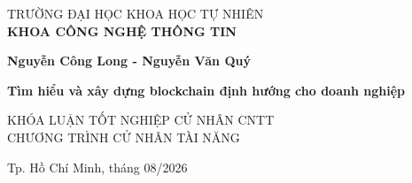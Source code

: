 \begin{titlepage}
{ %
\fontsize{18pt}{22pt}\selectfont

\begin{center}

TRƯỜNG ĐẠI HỌC KHOA HỌC TỰ NHIÊN\\
\textbf{KHOA CÔNG NGHỆ THÔNG TIN}
\vspace{4cm}

{\fontsize{22pt}{26pt}\selectfont
\textbf{Nguyễn Công Long - Nguyễn Văn Quý}
}
\vspace{4cm}

{ \fontsize{26pt}{30pt}\selectfont
\textbf{ Tìm hiểu và xây dựng blockchain định hướng cho doanh nghiệp}
}
\vfill

KHÓA LUẬN TỐT NGHIỆP CỬ NHÂN CNTT\\
CHƯƠNG TRÌNH CỬ NHÂN TÀI NĂNG
\vspace{3cm}


Tp. Hồ Chí Minh, tháng 08/2026
\end{center}

} %
\end{titlepage}

